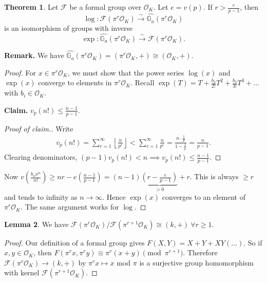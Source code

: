 \documentclass{article}
\theoremstyle{definition}
\newtheorem{theorem}{Theorem}[section]
\newtheorem{lemma}[theorem]{Lemma}
\begin{document}
\begin{theorem}\label{theorem9.2}
    Let $\mathcal{F}$ be a formal group over $\mathcal{O}_K$. Let $e = v(p)$. If $r > \frac{e}{p-1}$, then \[
    \log : \mathcal{F}(\pi^r \mathcal{O}_K) \stackrel{\sim}{\longrightarrow} \widehat{\mathbb{G}_a}(\pi^r \mathcal{O}_K)
    \]
    is an isomorphism of groups with inverse \[
    \exp : \widehat{\mathbb{G}_a}(\pi^r \mathcal{O}_K) \stackrel{\sim}{\longrightarrow} \mathcal{F}(\pi^r \mathcal{O}_K). 
    \]
\end{theorem} 
\textbf{Remark.} We have $\widehat{\mathbb{G}_a}(\pi^r \mathcal{O}_K) = (\pi^r \mathcal{O}_K, +) \cong (\mathcal{O}_K, +)$.
\begin{proof}
    For $x \in \pi^r \mathcal{O}_K$, we must show that the power series $\log(x)$ and $\exp(x)$ converge to elements in $\pi^r \mathcal{O}_K$. Recall $\exp(T) = T + \frac{b_2}{2!}T^2 + \frac{b_3}{3!}T^3 + \ldots$ with $b_i \in \mathcal{O}_K$.
    \vspace{1mm}
     
    \textbf{Claim.} $v_p(n!)\le \frac{n-1}{p-1}$.
    \begin{proof}[Proof of claim.]
        Write 
        \begin{align*}
            v_p(n!) = \sum_{r=1}^{\infty} \left\lfloor \frac{n}{p^r} \right\rfloor < \sum_{r=1}^{\infty} \frac{n}{p^r} = \frac{n \cdot \frac{1}{p}}{1-\frac{1}{p}} = \frac{n}{p-1}.
        \end{align*}
        Clearing denominators, $(p-1)v_p(n!)<n \implies v_p(n!) \le \frac{n-1}{p-1}$.
    \end{proof}
    Now $v\left(\frac{b_nx^n}{n!}\right) \ge nr - e \left(\frac{n-1}{p-1}\right) = (n-1)\underbrace{\left( r - \frac{e}{p-1}\right)}_{>0} + r$. This is always $\ge r$ and tends to infinity as $n \to \infty$. Hence $\exp(x)$ converges to an element of $\pi^r \mathcal{O}_K$. The same argument works for $\log$.
\end{proof}
\begin{lemma}\label{lemma9.3}
    We have $\mathcal{F}(\pi^r \mathcal{O}_K)/\mathcal{F}(\pi^{r+1}\mathcal{O}_K) \cong (k,+) ~\forall r\ge 1$.
\end{lemma}
\begin{proof}
    Our definition of a formal group gives $F(X,Y) = X + Y + XY(\ldots)$. So if $x, y \in \mathcal{O}_K$, then $F(\pi^r x, \pi^r y) \equiv \pi^r(x+y) \pmod{\pi^{r+1}}$. Therefore $\mathcal{F}(\pi^r \mathcal{O}_K) \to (k,+)$ by $\pi^r x \mapsto x $ mod $\pi$ is a surjective group homomorphism with kernel $\mathcal{F}(\pi^{r+1}\mathcal{O}_K)$.
\end{proof}
\end{document}

